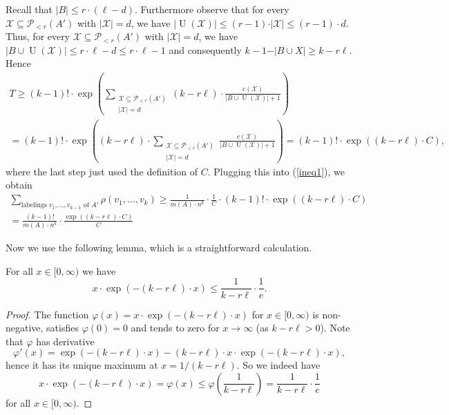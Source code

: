 Recall that $\vert B\vert\leq r\cdot (\ell-d)$. Furthermore observe that for every $\mathcal{X}\subseteq \mathcal{P}\!_{<r}(A')$ with $\vert \mathcal{X}\vert=d$, we have $\vert \operatorname{U}(\mathcal{X})\vert\leq (r-1)\cdot \vert \mathcal{X}\vert\leq (r-1)\cdot d$. Thus, for every $\mathcal{X}\subseteq \mathcal{P}\!_{<r}(A')$ with $\vert \mathcal{X}\vert=d$, we have $\vert B\cup \operatorname{U}(\mathcal{X})\vert\leq r\cdot \ell-d\leq r\cdot \ell-1$ and consequently $k-1-\vert B\cup X\vert\geq k-r\ell$. Hence
\begin{multline*}
T\geq (k-1)!\cdot \exp\left(\sum_{\substack{\mathcal{X}\subseteq \mathcal{P}\!_{<r}(A')\\\vert \mathcal{X}\vert=d}}(k-r\ell)\cdot \frac{c(\mathcal{X})}{\vert B\cup \operatorname{U}(\mathcal{X})\vert+1}\right)\\
=(k-1)!\cdot \exp\left((k-r\ell)\cdot \sum_{\substack{\mathcal{X}\subseteq \mathcal{P}\!_{<r}(A')\\\vert \mathcal{X}\vert=d}}\frac{c(\mathcal{X})}{\vert B\cup \operatorname{U}(\mathcal{X})\vert+1}\right)=(k-1)!\cdot \exp\left((k-r\ell)\cdot C\right),
\end{multline*}
where the last step just used the definition of $C$. Plugging this into (\ref{ineq1}), we obtain
\begin{multline*}
\sum_{\text{labelings }v_1,\dots, v_{k-1}\text{ of } A'}\rho(v_1,\dots,v_k)
\geq \frac{1}{m(A)\cdot n^k}\cdot \frac{1}{C}\cdot (k-1)!\cdot \exp\left((k-r\ell)\cdot C\right)\\
= \frac{(k-1)!}{m(A)\cdot n^k}\cdot \frac{\exp\left((k-r\ell)\cdot C\right)}{C}
\end{multline*}

Now we use the following lemma, which is a straightforward calculation.

\begin{lemma}\label{lemma2}For all $x\in [0,\infty)$ we have
\[x\cdot \exp(-(k-r\ell)\cdot x)\leq \frac{1}{k-r\ell}\cdot \frac{1}{e}.\]
\end{lemma}
\begin{proof}
The function $\varphi(x)=x\cdot \exp(-(k-r\ell)\cdot x)$ for $x\in [0,\infty)$ is non-negative, satisfies $\varphi(0)=0$ and tends to zero for $x\to \infty$ (as $k-r\ell>0$). Note that $\varphi$ has derivative
\[\varphi'(x)=\exp(-(k-r\ell)\cdot x)-(k-r\ell)\cdot x\cdot \exp(-(k-r\ell)\cdot x),\]
hence it has its unique maximum at $x=1/(k-r\ell)$. So we indeed have \[x\cdot \exp(-(k-r\ell)\cdot x)=\varphi(x)\leq \varphi\left(\frac{1}{k-r\ell}\right)= \frac{1}{k-r\ell}\cdot \frac{1}{e}\]
for all $x\in [0,\infty)$.
\end{proof}

